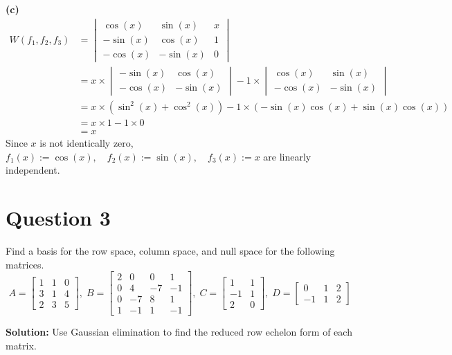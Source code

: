 \documentclass{article}
\begin{document}
\vspace{0.25cm}
\noindent\textbf{(c)}
\begin{align*}
W(f_1, f_2, f_3) &= \begin{vmatrix} \cos(x) & \sin(x) & x \\ -\sin(x) & \cos(x) & 1 \\ -\cos(x) & -\sin(x) & 0 \end{vmatrix} \\
&= x \times \begin{vmatrix} -\sin(x) & \cos(x) \\ -\cos(x) & -\sin(x) \end{vmatrix} - 1 \times \begin{vmatrix} \cos(x) & \sin(x) \\ -\cos(x) & -\sin(x) \end{vmatrix} \\
&= x \times (\sin^2(x) + \cos^2(x)) - 1 \times (-\sin(x)\cos(x) + \sin(x)\cos(x)) \\
&= x \times 1 - 1 \times 0 \\
&= x
\end{align*}
Since $x$ is not identically zero, $f_1(x) := \cos(x), \quad f_2(x) := \sin(x), \quad f_3(x) := x$ are linearly independent.

\newpage
\section*{Question 3}
Find a basis for the row space, column space, and null space for the following matrices.
$$
A = \begin{bmatrix} 1 & 1 & 0 \\ 3 & 1 & 4 \\ 2 & 3 & 5 \end{bmatrix}, \;
B = \begin{bmatrix} 2 & 0 & 0 & 1 \\ 0 & 4 & -7 & -1 \\ 0 & -7 & 8 & 1 \\ 1 & -1 & 1 & -1 \end{bmatrix}, \;
C = \begin{bmatrix} 1 & 1 \\ -1 & 1 \\ 2 & 0 \end{bmatrix}, \;
D = \begin{bmatrix} 0 & 1 & 2 \\ -1 & 1 & 2 \end{bmatrix}
$$

\noindent\textbf{Solution:} Use Gaussian elimination to find the reduced row echelon form of each matrix.
\end{document}
